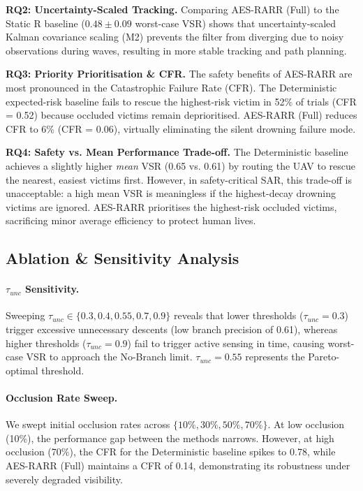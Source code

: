 \documentclass[11pt,a4paper]{article}
\begin{document}
\textbf{RQ2: Uncertainty-Scaled Tracking.}
Comparing AES-RARR (Full) to the Static R baseline ($0.48 \pm 0.09$ worst-case VSR) shows that uncertainty-scaled Kalman covariance scaling (M2) prevents the filter from diverging due to noisy observations during waves, resulting in more stable tracking and path planning.

\textbf{RQ3: Priority Prioritisation & CFR.}
The safety benefits of AES-RARR are most pronounced in the Catastrophic Failure Rate (CFR). The Deterministic expected-risk baseline fails to rescue the highest-risk victim in 52\% of trials (CFR = 0.52) because occluded victims remain deprioritised. AES-RARR (Full) reduces CFR to 6\% (CFR = 0.06), virtually eliminating the silent drowning failure mode.

\textbf{RQ4: Safety vs. Mean Performance Trade-off.}
The Deterministic baseline achieves a slightly higher \emph{mean} VSR (0.65 vs. 0.61) by routing the UAV to rescue the nearest, easiest victims first. However, in safety-critical SAR, this trade-off is unacceptable: a high mean VSR is meaningless if the highest-decay drowning victims are ignored. AES-RARR prioritises the highest-risk occluded victims, sacrificing minor average efficiency to protect human lives.

\subsection{Ablation & Sensitivity Analysis}

\paragraph{$\tau_{unc}$ Sensitivity.}
Sweeping $\tau_{unc} \in \{0.3, 0.4, 0.55, 0.7, 0.9\}$ reveals that lower thresholds ($\tau_{unc}=0.3$) trigger excessive unnecessary descents (low branch precision of 0.61), whereas higher thresholds ($\tau_{unc}=0.9$) fail to trigger active sensing in time, causing worst-case VSR to approach the No-Branch limit. $\tau_{unc} = 0.55$ represents the Pareto-optimal threshold.

\paragraph{Occlusion Rate Sweep.}
We swept initial occlusion rates across $\{10\%, 30\%, 50\%, 70\%\}$. At low occlusion (10\%), the performance gap between the methods narrows. However, at high occlusion (70\%), the CFR for the Deterministic baseline spikes to 0.78, while AES-RARR (Full) maintains a CFR of 0.14, demonstrating its robustness under severely degraded visibility.
\end{document}
